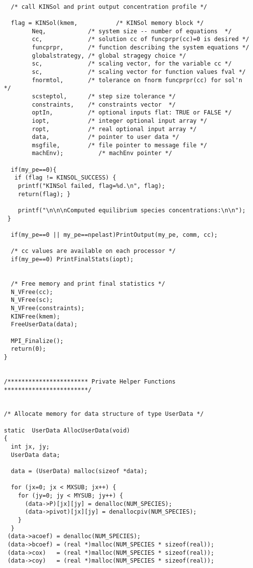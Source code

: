 \begin{verbatim}
 
  /* call KINSol and print output concentration profile */

  flag = KINSol(kmem,           /* KINSol memory block */
		Neq,            /* system size -- number of equations  */
		cc,             /* solution cc of funcprpr(cc)=0 is desired */
		funcprpr,       /* function describing the system equations */
		globalstrategy, /* global stragegy choice */
		sc,             /* scaling vector, for the variable cc */
		sc,             /* scaling vector for function values fval */
		fnormtol,       /* tolerance on fnorm funcprpr(cc) for sol'n */
		scsteptol,      /* step size tolerance */
		constraints,    /* constraints vector  */
		optIn,          /* optional inputs flat: TRUE or FALSE */
		iopt,           /* integer optional input array */
		ropt,           /* real optional input array */
		data,           /* pointer to user data */
		msgfile,        /* file pointer to message file */
		machEnv);          /* machEnv pointer */

  if(my_pe==0){
   if (flag != KINSOL_SUCCESS) { 
    printf("KINSol failed, flag=%d.\n", flag); 
    return(flag); }

    printf("\n\n\nComputed equilibrium species concentrations:\n\n");
 }

  if(my_pe==0 || my_pe==npelast)PrintOutput(my_pe, comm, cc);

  /* cc values are available on each processor */
  if(my_pe==0) PrintFinalStats(iopt);
 

  /* Free memory and print final statistics */  
  N_VFree(cc);
  N_VFree(sc);
  N_VFree(constraints);
  KINFree(kmem);
  FreeUserData(data);

  MPI_Finalize();
  return(0);
}


/*********************** Private Helper Functions ************************/


/* Allocate memory for data structure of type UserData */

static  UserData AllocUserData(void)
{
  int jx, jy;
  UserData data;

  data = (UserData) malloc(sizeof *data);

  for (jx=0; jx < MXSUB; jx++) {
    for (jy=0; jy < MYSUB; jy++) {
      (data->P)[jx][jy] = denalloc(NUM_SPECIES);
      (data->pivot)[jx][jy] = denallocpiv(NUM_SPECIES);
    }
  }
 (data->acoef) = denalloc(NUM_SPECIES);
 (data->bcoef) = (real *)malloc(NUM_SPECIES * sizeof(real));
 (data->cox)   = (real *)malloc(NUM_SPECIES * sizeof(real));
 (data->coy)   = (real *)malloc(NUM_SPECIES * sizeof(real));
 


\end{verbatim}
